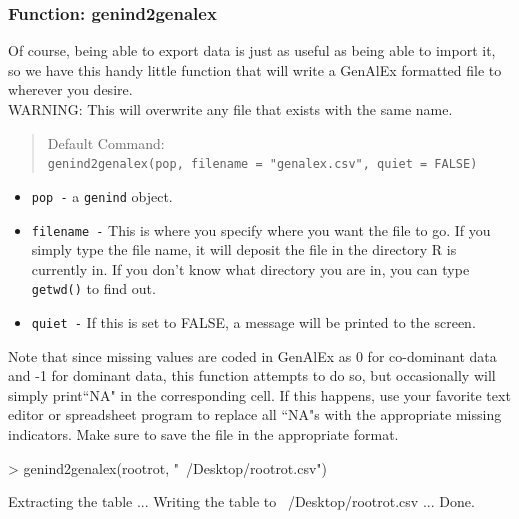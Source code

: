 \documentclass[letterpaper]{article}
\newcommand{\tab}{\hspace*{1em}}
\begin{document}
\subsubsection{Function: genind2genalex}

\tab\tab Of course, being able to export data is just as useful as being able to import it, so we have this handy little function that will write a GenAlEx formatted file to wherever you desire.\\ 
WARNING: This will overwrite any file that exists with the same name.
\begin{quote}
Default Command:\\
\texttt{genind2genalex(pop, filename = "genalex.csv", quiet = FALSE)}
\end{quote}
\begin{itemize}
  \item \texttt{pop -} a \texttt{genind} object.
  \item \texttt{filename -} This is where you specify where you want the file to go. If you simply type the file name, it will deposit the file in the directory R is currently in. If you don't know what directory you are in, you can type \texttt{getwd()} to find out.
  \item \texttt{quiet -} If this is set to FALSE, a message will be printed to the screen.
\end{itemize}

Note that since missing values are coded in GenAlEx as 0 for co-dominant data and -1 for dominant data, this function attempts to do so, but occasionally will simply print``NA" in the corresponding cell. If this happens, use your favorite text editor or spreadsheet program to replace all ``NA"s with the appropriate missing indicators. Make sure to save the file in the appropriate format. 
\begin{Schunk}
\begin{Sinput}
> genind2genalex(rootrot, "~/Desktop/rootrot.csv")
\end{Sinput}
\end{Schunk}
\begin{Schunk}
\begin{Soutput}
Extracting the table ... Writing the table to ~/Desktop/rootrot.csv ... Done.
\end{Soutput}
\end{Schunk}
\end{document}
